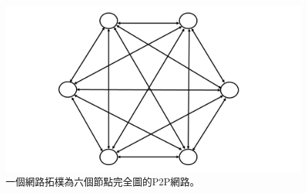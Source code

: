 \begin{figure}[H]
\centering
\includegraphics[scale=0.28]{images/6.jpg}
\caption{一個網路拓樸為六個節點完全圖的P2P網路。}
\label{i:byz-latency}
\end{figure}